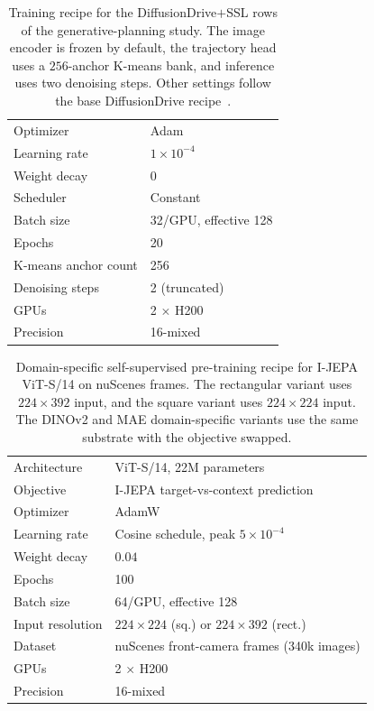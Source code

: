 \begin{table}[ht]
    \centering
    \caption[Training recipe: DiffusionDrive + SSL (generative-planning study).]{Training recipe for the DiffusionDrive$+$SSL rows of the generative-planning study. The image encoder is frozen by default, the trajectory head uses a $256$-anchor K-means bank, and inference uses two denoising steps. Other settings follow the base DiffusionDrive recipe~\cite{jia-diffusiondrive-2025}.}
    \label{tab:hparam-phase2-dd}
    \small
    \begin{tabular}{ll}
    \toprule
    Optimizer             & Adam \\
    Learning rate         & $1\times10^{-4}$ \\
    Weight decay          & $0$ \\
    Scheduler             & Constant \\
    Batch size            & 32/GPU, effective 128 \\
    Epochs                & 20 \\
    K-means anchor count  & 256 \\
    Denoising steps       & 2 (truncated) \\
    GPUs                  & 2 $\times$ H200 \\
    Precision             & 16-mixed \\
    \bottomrule
    \end{tabular}
\end{table}

\begin{table}[ht]
    \centering
    \caption[Pre-training recipe: I-JEPA ViT-S/14 on nuScenes.]{Domain-specific self-supervised pre-training recipe for I-JEPA ViT-S/14 on nuScenes frames. The rectangular variant uses $224 \times 392$ input, and the square variant uses $224 \times 224$ input. The DINOv2 and MAE domain-specific variants use the same substrate with the objective swapped.}
    \label{tab:hparam-phase3-ssl-pretrain}
    \small
    \begin{tabular}{ll}
    \toprule
    Architecture          & ViT-S/14, 22M parameters \\
    Objective             & I-JEPA target-vs-context prediction \\
    Optimizer             & AdamW \\
    Learning rate         & Cosine schedule, peak $5\times10^{-4}$ \\
    Weight decay          & $0.04$ \\
    Epochs                & 100 \\
    Batch size            & 64/GPU, effective 128 \\
    Input resolution      & $224\times224$ (sq.) or $224\times392$ (rect.) \\
    Dataset               & nuScenes front-camera frames (340k images) \\
    GPUs                  & 2 $\times$ H200 \\
    Precision             & 16-mixed \\
    \bottomrule
    \end{tabular}
\end{table}
